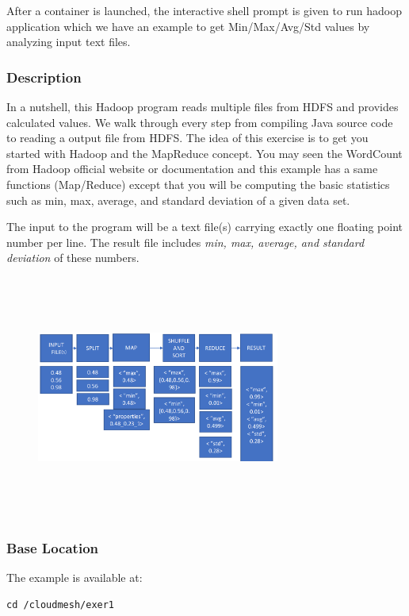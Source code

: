 After a container is launched, the interactive shell prompt is given
to run hadoop application which we have an example to get
Min/Max/Avg/Std values by analyzing input text files.

\subsubsection{Description}

In a nutshell, this Hadoop program reads multiple files from HDFS and
provides calculated values. We walk through every step from compiling
Java source code to reading a output file from HDFS. The idea of this
exercise is to get you started with Hadoop and the MapReduce
concept. You may seen the WordCount from Hadoop official website or
documentation and this example has a same functions (Map/Reduce)
except that you will be computing the basic statistics such as min,
max, average, and standard deviation of a given data set.

The input to the program will be a text file(s) carrying exactly one
floating point number per line. The result file includes \textit{min,
  max, average, and standard deviation} of these numbers.


  \begin{figure}[!htbp]
    \includegraphics[width=8cm,height=8cm]{section/container/images/docker-hadoop-1.png}
    \centering
  \end{figure}

\subsubsection{Base Location}

The example is available at:

\begin{lstlisting}
cd /cloudmesh/exer1
\end{lstlisting}

